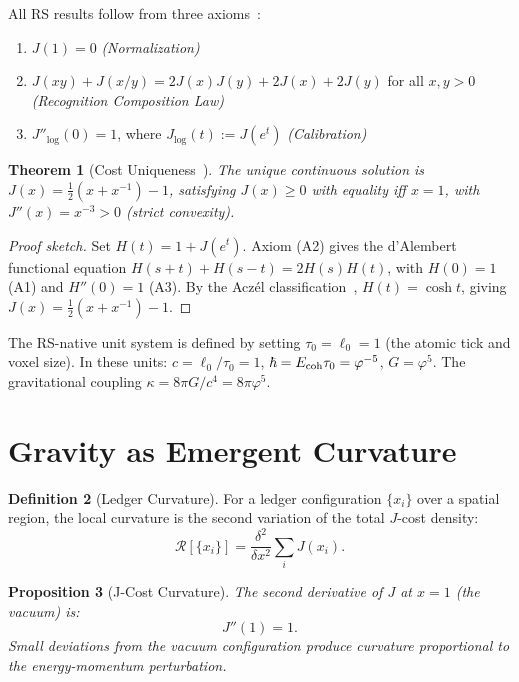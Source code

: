 \documentclass[12pt,a4paper]{article}
\newtheorem{theorem}{Theorem}[section]
\newtheorem{proposition}[theorem]{Proposition}
\theoremstyle{definition}
\newtheorem{definition}[theorem]{Definition}
\theoremstyle{remark}
\begin{document}
All RS results follow from three axioms~\cite{RS_Axioms}:
\begin{enumerate}[label=(A\arabic*),nosep]
  \item $J(1) = 0$ \hfill\textit{(Normalization)}
  \item $J(xy) + J(x/y) = 2J(x)J(y) + 2J(x) + 2J(y)$ for all $x, y > 0$
  \hfill\textit{(Recognition Composition Law)}
  \item $J''_{\log}(0) = 1$, where $J_{\log}(t) := J(e^t)$
  \hfill\textit{(Calibration)}
\end{enumerate}

\begin{theorem}[Cost Uniqueness~\cite{RS_Axioms}]
\label{thm:J}
The unique continuous solution is $J(x) = \tfrac{1}{2}(x + x^{-1}) - 1$,
satisfying $J(x) \geq 0$ with equality iff $x = 1$, with
$J''(x) = x^{-3} > 0$ (strict convexity).
\end{theorem}

\begin{proof}[Proof sketch]
Set $H(t) = 1 + J(e^t)$.  Axiom (A2) gives the d'Alembert functional
equation $H(s+t)+H(s-t) = 2H(s)H(t)$, with $H(0)=1$ (A1)
and $H''(0)=1$ (A3).  By the Acz\'el classification~\cite{Aczel1966},
$H(t) = \cosh t$, giving $J(x) = \tfrac{1}{2}(x+x^{-1})-1$.
\end{proof}

The RS-native unit system is defined by setting $\tau_0 = \ell_0 = 1$
(the atomic tick and voxel size).  In these units:
$c = \ell_0/\tau_0 = 1$,
$\hbar = E_{\rm coh} \tau_0 = \varphi^{-5}$,
$G = \varphi^5$.
The gravitational coupling $\kappa = 8\pi G/c^4 = 8\pi\varphi^5$.

\section{Gravity as Emergent Curvature}
\label{sec:emergent}

\begin{definition}[Ledger Curvature]
\label{def:curvature}
For a ledger configuration $\{x_i\}$ over a spatial region,
the local curvature is the second variation of the total
$J$-cost density:
\begin{equation}
  \mathcal{R}[\{x_i\}]
  = \frac{\delta^2}{\delta x^2}
  \sum_i J(x_i).
\end{equation}
\end{definition}

\begin{proposition}[J-Cost Curvature]
\label{prop:jcurvature}
The second derivative of $J$ at $x = 1$ (the vacuum) is:
\begin{equation}
  J''(1) = 1.
\end{equation}
Small deviations from the vacuum configuration produce
curvature proportional to the energy-momentum perturbation.
\end{proposition}
\end{document}
